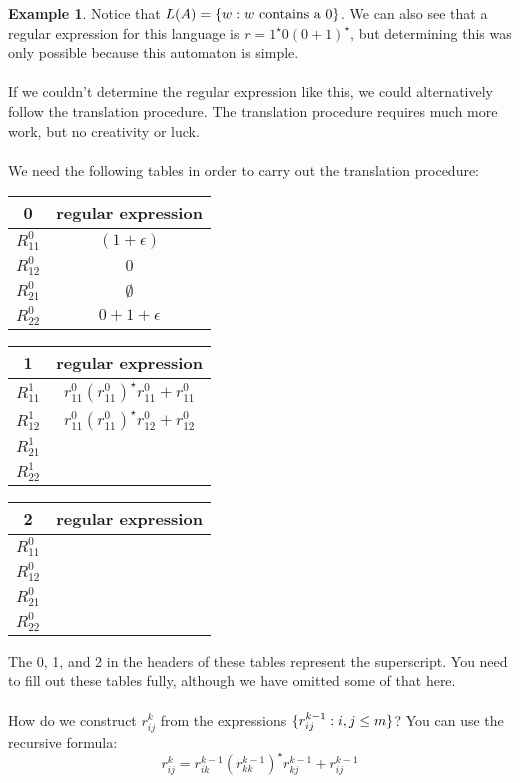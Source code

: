\documentclass[]{article}
\DeclarePairedDelimiter{\set}{\lbrace}{\rbrace}
\theoremstyle{definition}
\newtheorem{ex}{Example}[section]
\begin{document}
\begin{enumerate}
\begin{ex}
            Notice that $L(A) = \set{ w : w \text{ contains a } 0}$. We can also see that a regular expression for this language is $r = 1^\star 0(0 + 1)^\star$, but determining this was only possible because this automaton is simple.
            \\ \\
            If we couldn't determine the regular expression like this, we could alternatively follow the translation procedure. The translation procedure requires much more work, but no creativity or luck.
            \\ \\
            We need the following tables in order to carry out the translation procedure:
            \begin{center}
              \begin{tabular}{c|c}
                0 & regular expression \\ \hline
                $R_{11}^0$ & $(1 + \epsilon)$ \\
                $R_{12}^0$ & $0$ \\
                $R_{21}^0$ & $\emptyset$ \\
                $R_{22}^0$ & $0 + 1 + \epsilon$
              \end{tabular}
              \begin{tabular}{c|c}
                1 & regular expression \\ \hline
                $R_{11}^1$ & $r_{11}^0 (r_{11}^0)^\star r_{11}^0 + r_{11}^0$ \\
                $R_{12}^1$ & $r_{11}^0  (r_{11}^0)^\star r_{12}^0 + r_{12}^0$ \\
                $R_{21}^1$ & \\
                $R_{22}^1$ & \\
              \end{tabular}
              \begin{tabular}{c|c}
                2 & regular expression \\ \hline
                $R_{11}^0$ & \\
                $R_{12}^0$ & \\
                $R_{21}^0$ & \\
                $R_{22}^0$ & \\
              \end{tabular}
            \end{center}

            The 0, 1, and 2 in the headers of these tables represent the superscript. You need to fill out these tables fully, although we have omitted some of that here.
            \\ \\
            How do we construct $r_{ij}^k$ from the expressions $\set{ r_{ij}^{k - 1} : i, j \le m }$? You can use the recursive formula:
            $$
              r_{ij}^k = r_{ik}^{k - 1} (r_{kk}^{k - 1})^\star r_{kj}^{k - 1} + r_{ij}^{k - 1}
            $$


\end{ex}
\end{enumerate}
\end{document}
